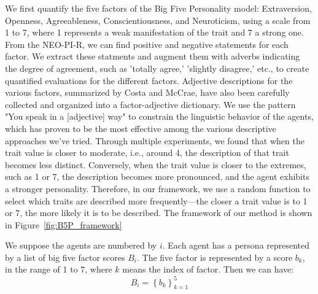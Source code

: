 We first quantify the five factors of the Big Five Personality model: Extraversion, Openness, Agreeableness, Conscientiousness, and Neuroticism, using a scale from 1 to 7, where 1 represents a weak manifestation of the trait and 7 a strong one. From the NEO-PI-R, we can find positive and negative statements for each factor. We extract these statments and augment them with adverbs indicating the degree of agreement, such as 'totally agree,' 'slightly disagree,' etc., to create quantified evaluations for the different factors. Adjective descriptions for the various factors, summarized by Costa and McCrae, have also been carefully collected and organized into a factor-adjective dictionary. We use the pattern "You speak in a [adjective] way" to constrain the linguistic behavior of the agents, which has proven to be the most effective among the various descriptive approaches we've tried. Through multiple experiments, we found that when the trait value is closer to moderate, i.e., around 4, the description of that trait becomes less distinct. Conversely, when the trait value is closer to the extremes, such as 1 or 7, the description becomes more pronounced, and the agent exhibits a stronger personality. Therefore, in our framework, we use a random function to select which traits are described more frequently—the closer a trait value is to 1 or 7, the more likely it is to be described. The framework of our method is shown in Figure~\ref{fig:B5P_framework}

We suppose the agents are numbered by $ i $. Each agent has a persona represented by a list of big five factor scores $ B_i $. The five factor is represented by a score $ b_k $, in the range of 1 to 7, where $ k $ means the index of factor. Then we can have:
\begin{equation}
  B_i ={\left\{ b_k \right\}}_{k=1}^{5}
\end{equation}

